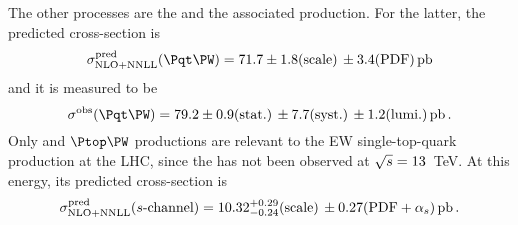 The other processes are the \schannel and the associated \tW production.
For the latter, the predicted cross-section is~\cite{Kidonakis:2021vob}
\begin{equation*}
\sigma^{\text{pred}}_{\text{NLO+NNLL}} (\tW) = 71.7 \pm 1.8 \text{(scale)}\, \pm 3.4\text{(PDF)}\,\textrm{pb}
\end{equation*} 
and it is measured to be~\cite{CMS:2022ytw}
\begin{equation*}
\sigma^{\text{obs}} (\tW) = 79.2 \pm 0.9 \text{(stat.)}\, \pm 7.7\text{(syst.)} \, \pm 1.2 \text{(lumi.)} \,\textrm{pb} \, .
\end{equation*} 
Only \tchannel and $\Ptop\PW$ productions are relevant to the EW 
single-top-quark production at the LHC, since the \schannel has not 
been observed at $\sqrt{s}=13$~TeV. At this energy, its predicted cross-section is~\cite{Kant:2014oha}
\begin{equation*} 
	\sigma^{\text{pred}}_{\text{NLO+NNLL}} (s\text{-channel}) = 10.32^{+0.29}_{-0.24}\text{(scale)}\,\pm 0.27(\text{PDF}+\alpha_{s}) \,\textrm{pb} \, .
\end{equation*} 





